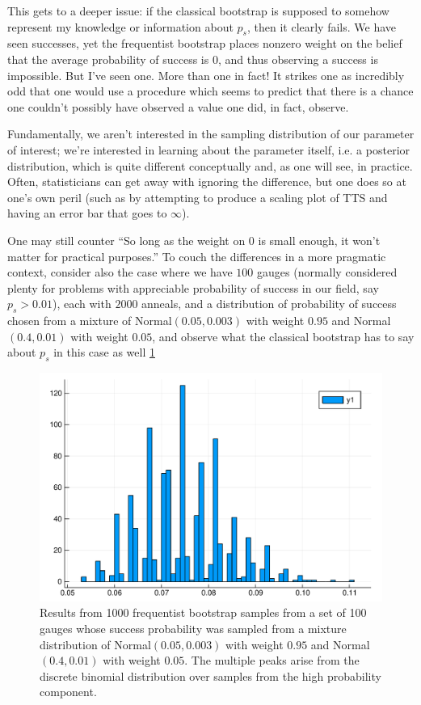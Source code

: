 This gets to a deeper issue: if the classical bootstrap is supposed to somehow represent my knowledge or information about $p_s$, then it clearly fails. We have seen successes, yet the frequentist bootstrap places nonzero weight on the belief that the average probability of success is $0$, and thus observing a success is impossible. But I've seen one. More than one in fact! It strikes one as incredibly odd that one would use a procedure which seems to predict that there is a chance one couldn't possibly have observed a value one did, in fact, observe.

Fundamentally, we aren't interested in the sampling distribution of our parameter of interest; we're interested in learning about the parameter itself, i.e. a posterior distribution, which is quite different conceptually and, as one will see, in practice. Often, statisticians can get away with ignoring the difference, but one does so at one's own peril (such as by attempting to produce a scaling plot of TTS and having an error bar that goes to $\infty$).

One may still counter ``So long as the weight on 0 is small enough, it won't matter for practical purposes.'' To couch the differences in a more pragmatic context, consider also the case where we have $100$ gauges (normally considered plenty for problems with appreciable probability of success in our field, say $p_s>0.01$), each with $2000$ anneals, and a distribution of probability of success chosen from a mixture of Normal$(0.05,0.003)$ with weight $0.95$ and Normal$(0.4,0.01)$ with weight $0.05$, and observe what the classical bootstrap has to say about $p_s$ in this case as well \ref{fig:pointy}

\begin{figure}[hbt]
  \includegraphics[width=\columnwidth]{chapters/Benchmarking/pointy}
  \caption{Results from 1000 frequentist bootstrap samples from a set of 100 gauges whose success probability was sampled from a mixture distribution of Normal$(0.05,0.003)$ with weight $0.95$ and Normal$(0.4,0.01)$ with weight $0.05$. The multiple peaks arise from the discrete binomial distribution over samples from the high probability component.}
  \label{fig:pointy}
\end{figure}

